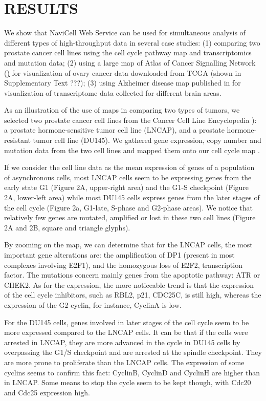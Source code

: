 \documentclass[a4,center,fleqn]{NAR}
\begin{document}
\section{RESULTS}

We show that NaviCell Web Service can be used for simultaneous analysis of different types of high-throughput data
in several case studies:
(1) comparing two prostate cancer cell lines using the cell cycle pathway map and transcriptomics and mutation data;
(2) using a large map of Atlas of Cancer Signalling Network (\href{http://acsn.curie.fr}) \cite{XXX} for visualization of ovary cancer data downloaded from TCGA \cite{XXX} (shown in Supplementary Text ???);
(3) using Alzheimer disease map published in \cite{XXX} for visualization of transcriptome data collected for different brain areas.

As an illustration of the use of maps in comparing two types of tumors, we
selected two prostate cancer cell lines from the Cancer Cell Line Encyclopedia
\cite{barretina2012cancer}): a prostate hormone-sensitive
tumor cell line (LNCAP), and a prostate hormone-resistant tumor cell line
(DU145). We gathered gene expression, copy number and mutation data from
the two cell lines and mapped them onto our cell cycle map
\cite{calzone2008comprehensive}.

If we consider the cell line data as the mean expression of genes of a
population of asynchronous cells, most LNCAP cells seem to be expressing genes
from the early state G1 (Figure 2A, upper-right area) and the G1-S checkpoint
(Figure 2A, lower-left area) while most DU145 cells express genes from the
later stages of the cell cycle (Figure 2a, G1-late, S-phase and G2-phase
areas).  We notice that relatively few genes are mutated, amplified or lost
in these two cell lines (Figure 2A and 2B, square and triangle glyphs).

By zooming on the map, we can determine that for the LNCAP cells, the most
important gene alterations are: the amplification of DP1 (present in most
complexes involving E2F1), and the homozygous loss of E2F2, transcription
factor. The mutations concern mainly genes from the apoptotic pathway: ATR or
CHEK2. As for the expression, the more noticeable trend is that the expression
of the cell cycle inhibitors, such as RBL2, p21, CDC25C, is still high, whereas
the expression of the G2 cyclin, for instance, CyclinA is low.

For the DU145 cells, genes involved in later stages of the cell cycle seem to
be more expressed compared to the LNCAP cells. It can be that if the cells were
arrested in LNCAP, they are more advanced in the cycle in DU145 cells by
overpassing the G1/S checkpoint and are arrested at the spindle checkpoint.
They are more prone to proliferate than the LNCAP cells. The expression of some
cyclins seems to confirm this fact: CyclinB, CyclinD and CyclinH are higher
than in LNCAP. Some means to stop the cycle seem to be kept though, with Cdc20
and Cdc25 expression high.
\end{document}
